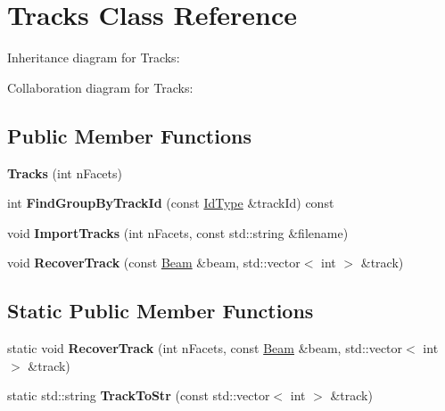 \hypertarget{class_tracks}{}\section{Tracks Class Reference}
\label{class_tracks}


Inheritance diagram for Tracks\+:


Collaboration diagram for Tracks\+:
\subsection*{Public Member Functions}
\begin{DoxyCompactItemize}
\item 
\mbox{\label{class_tracks_a1b25ede933c3cae43d01cdf5d16eae54}} 
{\bfseries Tracks} (int n\+Facets)
\item 
\mbox{\label{class_tracks_aeee2af5000d0c418f51a33f96d1e93f7}} 
int {\bfseries Find\+Group\+By\+Track\+Id} (const \mbox{\hyperlink{class_big_integer}{Id\+Type}} \&track\+Id) const
\item 
\mbox{\label{class_tracks_a7a61b8c7b50c6132a06b9883bf779f1b}} 
void {\bfseries Import\+Tracks} (int n\+Facets, const std\+::string \&filename)
\item 
\mbox{\label{class_tracks_aed07786d2b9af54a341ca8322d39d91c}} 
void {\bfseries Recover\+Track} (const \mbox{\hyperlink{class_beam}{Beam}} \&beam, std\+::vector$<$ int $>$ \&track)
\end{DoxyCompactItemize}
\subsection*{Static Public Member Functions}
\begin{DoxyCompactItemize}
\item 
\mbox{\label{class_tracks_a750266ba1e6ffc39554bda29a41a1801}} 
static void {\bfseries Recover\+Track} (int n\+Facets, const \mbox{\hyperlink{class_beam}{Beam}} \&beam, std\+::vector$<$ int $>$ \&track)
\item 
\mbox{\label{class_tracks_aaf66ef556b4523971ccebe04a28d7f7b}} 
static std\+::string {\bfseries Track\+To\+Str} (const std\+::vector$<$ int $>$ \&track)
\end{DoxyCompactItemize}
